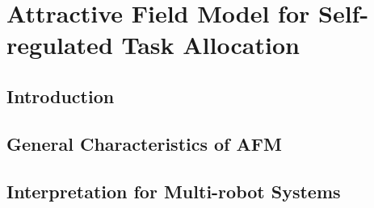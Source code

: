 \chapter{Attractive Field Model for Self-regulated Task Allocation}
\section{Introduction}

\section{General Characteristics of AFM}

\section{Interpretation for Multi-robot Systems}

